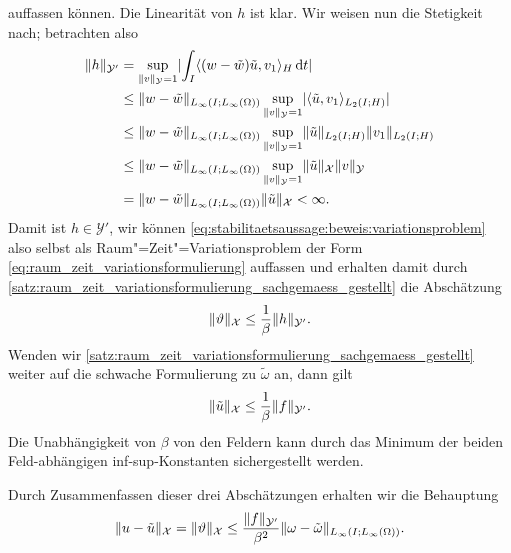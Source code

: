 \documentclass[../main.tex]{subfiles}
\begin{document}
\begin{Lemma}
\begin{Beweis}
\begin{equation}
        \end{equation}
        auffassen können.
        Die Linearität von $h$ ist klar.
        Wir weisen nun die Stetigkeit nach; betrachten also
        \begin{align}
            \lVert h\rVert_{\mathcal Y'}
            &= \sup_{\lVert v\rVert_{\mathcal Y} = 1} \lvert\int_{I} \langle(w - \tilde{w})\tilde{u},v_{1}\rangle_{H} \mathop{}\!\mathrm{d} t\rvert
            \\&\leq \lVert w - \tilde{w}\rVert_{L_{\infty}(I; L_{\infty}(\Omega))} \sup_{\lVert v\rVert_{\mathcal Y} = 1} \lvert\langle\tilde{u},v_{1}\rangle_{L_{2}(I; H)}\rvert
            \\&\leq \lVert w - \tilde{w}\rVert_{L_{\infty}(I; L_{\infty}(\Omega))} \sup_{\lVert v\rVert_{\mathcal Y} = 1} \lVert\tilde{u}\rVert_{L_{2}(I; H)} \lVert v_{1}\rVert_{L_{2}(I; H)}
            \\&\leq \lVert w - \tilde{w}\rVert_{L_{\infty}(I; L_{\infty}(\Omega))} \sup_{\lVert v\rVert_{\mathcal Y} = 1} \lVert\tilde{u}\rVert_{\mathcal X} \lVert v\rVert_{\mathcal Y}
            \\&= \lVert w - \tilde{w}\rVert_{L_{\infty}(I; L_{\infty}(\Omega))} \lVert\tilde{u}\rVert_{\mathcal X}
            < \infty.
        \end{align}
        Damit ist $h \in \mathcal Y'$, wir können \cref{eq:stabilitaetsaussage:beweis:variationsproblem} also selbst als Raum"=Zeit"=Variationsproblem der Form \cref{eq:raum_zeit_variationsformulierung} auffassen und erhalten damit durch \cref{satz:raum_zeit_variationsformulierung_sachgemaess_gestellt} die Abschätzung
        \begin{equation}
            \lVert\vartheta\rVert_{\mathcal X} \leq \frac{1}{\beta} \lVert h\rVert_{\mathcal Y'}.
        \end{equation}
        Wenden wir \cref{satz:raum_zeit_variationsformulierung_sachgemaess_gestellt} weiter auf die schwache Formulierung zu $\tilde{\omega}$ an, dann gilt
        \begin{equation}
            \lVert\tilde{u}\rVert_{\mathcal X} \leq \frac{1}{\beta} \lVert f\rVert_{\mathcal Y'}.
        \end{equation}
        Die Unabhängigkeit von $\beta$ von den Feldern kann durch das Minimum der beiden Feld-abhängigen inf-sup-Konstanten sichergestellt werden.

        Durch Zusammenfassen dieser drei Abschätzungen erhalten wir die Behauptung
        \begin{equation}
            \lVert u - \tilde{u}\rVert_{\mathcal X} = \lVert\vartheta\rVert_{\mathcal X} \leq \frac{\lVert f\rVert_{\mathcal Y'}}{\beta^{2}} \lVert\omega - \tilde{\omega}\rVert_{L_{\infty}(I; L_{\infty}(\Omega))}.
        \end{equation}
    \end{Beweis}
\end{Lemma}
\end{document}
